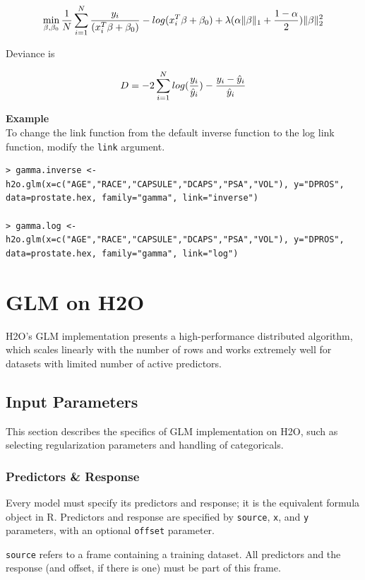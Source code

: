\documentclass{article}[11pt]
\begin{document}
\[  \min\limits_{\beta,\beta_0} { {1 \over N}\sum\limits_{i=1}\limits^{N}{y_i \over (x_i^{T}\beta  + \beta_0)} - log({x_i^{T}\beta  + \beta_0})  + \lambda (\alpha \|\beta \|_1 + {1-\alpha \over 2}) \| \beta \|_2^2} \]

Deviance is 

\[D = -2\sum\limits_{i=1}\limits^{N}{log({y_i \over \hat{y}_i}) - {y_i - \hat{y}_i \over\hat{y}_i }}\]


\textbf{Example}\\

To change the link function from the default inverse function to the log link function, modify the \texttt{link} argument.

\begin{lstlisting}[breaklines,basicstyle=\ttfamily]
> gamma.inverse <- h2o.glm(x=c("AGE","RACE","CAPSULE","DCAPS","PSA","VOL"), y="DPROS", data=prostate.hex, family="gamma", link="inverse")

> gamma.log <- h2o.glm(x=c("AGE","RACE","CAPSULE","DCAPS","PSA","VOL"), y="DPROS", data=prostate.hex, family="gamma", link="log")
\end{lstlisting}
\section{GLM on H2O}
H2O's GLM implementation presents a high-performance distributed algorithm, which scales linearly with the number of rows and works extremely well for datasets with limited number of active predictors. 

\subsection{Input Parameters}
This section describes the specifics of GLM implementation on H2O, such as selecting regularization parameters and handling of categoricals. 

\subsubsection{Predictors \& Response}
Every model must specify its predictors and response; it is the equivalent formula object in R. Predictors and response are specified by \texttt{source}, \texttt{x}, and \texttt{y} parameters, with an optional \texttt{offset} parameter. 

\texttt{source} refers to a frame containing a training dataset. All predictors and the response (and offset, if there is one) must be part of this frame.
\end{document}
